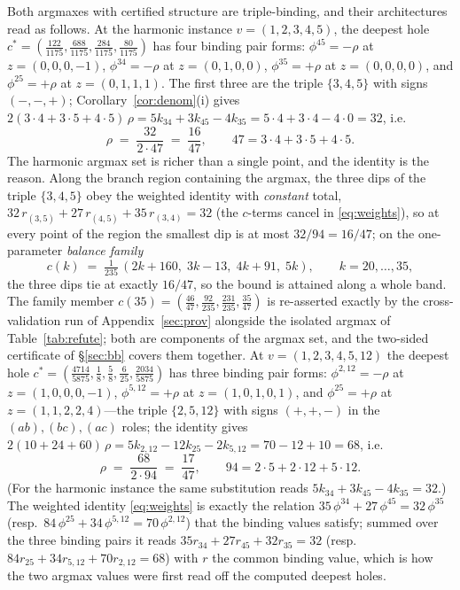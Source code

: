 \documentclass[11pt,a4paper]{article}
\numberwithin{equation}{section}
\theoremstyle{plain}
\theoremstyle{definition}
\theoremstyle{remark}
\begin{document}
Both argmaxes with certified structure are triple-binding, and their
architectures read
as follows. At the harmonic instance $v=(1,2,3,4,5)$, the deepest hole
$c^{*}=(\tfrac{122}{1175},\tfrac{688}{1175},\tfrac{284}{1175},
\tfrac{80}{1175})$ has four binding pair forms:
$\phi^{45}=-\rho$ at $z=(0,0,0,-1)$, $\phi^{34}=-\rho$ at
$z=(0,1,0,0)$, $\phi^{35}=+\rho$ at $z=(0,0,0,0)$, and
$\phi^{25}=+\rho$ at $z=(0,1,1,1)$. The first three are the triple
$\{3,4,5\}$ with signs $(-,-,+)$; Corollary~\ref{cor:denom}(i) gives
$2(3\cdot4+3\cdot5+4\cdot5)\,\rho=5k_{34}+3k_{45}-4k_{35}
=5\cdot4+3\cdot4-4\cdot0=32$, i.e.
\[
\rho\;=\;\frac{32}{2\cdot 47}\;=\;\frac{16}{47},
\qquad 47=3\cdot4+3\cdot5+4\cdot5.
\]
The harmonic argmax set is richer than a single point, and the identity
is the reason. Along the branch region containing the argmax, the three
dips of the triple $\{3,4,5\}$ obey the weighted identity with
\emph{constant} total,
$32\,r_{(3,5)}+27\,r_{(4,5)}+35\,r_{(3,4)}=32$ (the $c$-terms cancel
in \eqref{eq:weights}), so at every point of the region the smallest
dip is at most $32/94=16/47$; on the one-parameter \emph{balance
family}
\[
c(k)\;=\;\tfrac{1}{235}\,(2k{+}160,\;3k{-}13,\;4k{+}91,\;5k),
\qquad k=20,\dots,35,
\]
the three dips tie at exactly $16/47$, so the bound is attained along a
whole band. The family member $c(35)=(\tfrac{46}{47},
\tfrac{92}{235},\tfrac{231}{235},\tfrac{35}{47})$ is re-asserted
exactly by the cross-validation run of Appendix~\ref{sec:prov}
alongside the isolated argmax of Table~\ref{tab:refute}; both are
components of the argmax set, and the two-sided certificate of
\S\ref{sec:bb} covers them together.
At $v=(1,2,3,4,5,12)$ the deepest hole
$c^{*}=(\tfrac{4714}{5875},\tfrac18,\tfrac58,\tfrac6{25},
\tfrac{2034}{5875})$ has three binding pair forms: $\phi^{2,12}=-\rho$
at $z=(1,0,0,0,-1)$, $\phi^{5,12}=+\rho$ at $z=(1,0,1,0,1)$, and
$\phi^{25}=+\rho$ at $z=(1,1,2,2,4)$---the triple $\{2,5,12\}$ with
signs $(+{,}+{,}-)$ in the $(ab),(bc),(ac)$ roles; the identity gives
$2(10+24+60)\,\rho=5k_{2,12}-12k_{25}-2k_{5,12}=70-12+10=68$, i.e.
\[
\rho\;=\;\frac{68}{2\cdot 94}\;=\;\frac{17}{47},
\qquad 94=2\cdot5+2\cdot12+5\cdot12.
\]
(For the harmonic instance the same substitution reads
$5k_{34}+3k_{45}-4k_{35}=32$.)
The weighted identity \eqref{eq:weights} is exactly the relation
$35\,\phi^{34}+27\,\phi^{45}=32\,\phi^{35}$ (resp.\
$84\,\phi^{25}+34\,\phi^{5,12}=70\,\phi^{2,12}$) that the binding
values satisfy; summed over the three binding pairs it reads
$35r_{34}+27r_{45}+32r_{35}=32$ (resp.\ $84r_{25}+34r_{5,12}+70r_{2,12}
=68$) with $r$ the common binding value, which is how the two argmax
values were first read off the computed deepest holes.
\end{document}
